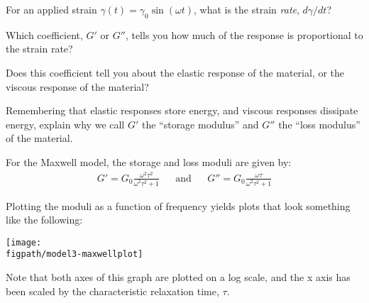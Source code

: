 \begin{activity}
\begin{ctqs}
					\begin{solution}[1.1in]
					\end{solution}
		
		\question For an applied strain $\gamma(t) = \gamma_0 \sin(\omega t)$, what is the strain \emph{rate}, $d\gamma/dt$?
	
					\begin{solution}[1.1in]
					\end{solution}
		
		\question Which coefficient, $G'$ or $G''$, tells you how much of the response is proportional to the strain rate?
	
					\begin{solution}[1.1in]
					\end{solution}
		
		\question Does this coefficient tell you about the elastic response of the material, or the viscous response of the material?
	
					\begin{solution}[1.1in]
					\end{solution}
		
		\question Remembering that elastic responses store energy, and viscous responses dissipate energy, explain why we call $G'$ the ``storage modulus'' and $G''$ the ``loss modulus'' of the material.
	
					\begin{solution}[2in]
					\end{solution}
			
\end{ctqs}

\begin{infobox}
	For the Maxwell model, the storage and loss moduli are given by:
	\begin{align*}
		G' = G_0 \frac{\omega^2 \tau^2}{\omega^2 \tau^2 + 1} && \text{and} && G'' = G_0 \frac{\omega \tau}{\omega^2 \tau^2 + 1}
	\end{align*}
	
	Plotting the moduli as a function of frequency yields plots that look something like the following:
				
		\centerline{\texttt{[image: \\figpath/model3-maxwellplot]}}
	
	Note that both axes of this graph are plotted on a log scale, and the x axis has been scaled by the characteristic relaxation time, $\tau$.
	
\end{infobox}


\end{activity}
